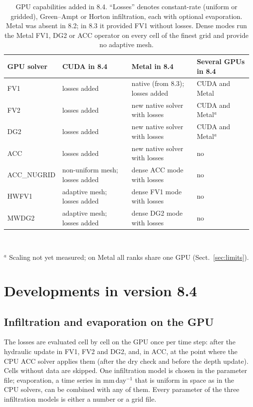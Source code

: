 \documentclass[draft,linenumbers]{agujournal2025}
\begin{document}
\begin{table}[t]
\caption{GPU capabilities added in 8.4. ``Losses'' denotes constant-rate
(uniform or gridded), Green--Ampt or Horton infiltration, each with optional
evaporation. Metal was absent in 8.2; in 8.3 it provided FV1 without losses.
Dense modes run the Metal FV1, DG2 or ACC operator on every cell of the
finest grid and provide no adaptive mesh.}
\label{tab:support}
\centering\small
\begin{tabularx}{\textwidth}{@{}l>{\raggedright\arraybackslash}X>{\raggedright\arraybackslash}X>{\raggedright\arraybackslash}X@{}}
\toprule
GPU solver & CUDA in 8.4 & Metal in 8.4 & Several GPUs in 8.4 \\
\midrule
FV1 & losses added & native (from 8.3); losses added & CUDA and Metal \\
FV2 & losses added & new native solver with losses & CUDA and Metal$^{a}$ \\
DG2 & losses added & new native solver with losses & CUDA and Metal$^{a}$ \\
ACC & losses added & new native solver with losses & no \\
ACC\_NUGRID & non-uniform mesh; losses added & dense ACC mode with losses & no \\
HWFV1 & adaptive mesh; losses added & dense FV1 mode with losses & no \\
MWDG2 & adaptive mesh; losses added & dense DG2 mode with losses & no \\
\bottomrule
\end{tabularx}
\\[2pt]\begin{minipage}{\textwidth}\footnotesize $^{a}$ Scaling not yet measured; on Metal all ranks share one GPU (Sect.~\ref{sec:limits}).\end{minipage}
\end{table}

\section{Developments in version 8.4}\label{sec:developments}

\subsection{Infiltration and evaporation on the GPU}\label{sec:losses}

The losses are evaluated cell by cell on the GPU once per time step: after
the hydraulic update in FV1, FV2 and DG2, and, in ACC, at the point where the
CPU ACC solver applies them (after the dry check and before the depth
update). Cells without data are skipped. One infiltration model is chosen in
the parameter file; evaporation, a time series in mm\,day$^{-1}$ that is
uniform in space as in the CPU solvers, can be combined with any of them.
Every parameter of the three infiltration models is either a number or a grid
file.
\end{document}
